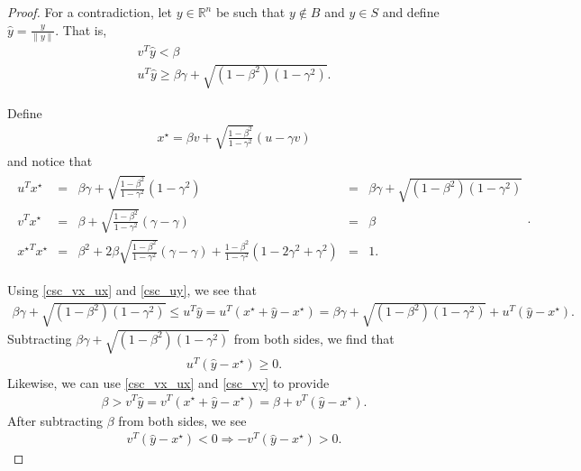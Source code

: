 \documentclass{article}
\theoremstyle{case}
\newcommand{\Rn}{\mathbb R^n}
\begin{document}
\begin{proof}
For a contradiction, let $y \in \Rn$ be such that $y \not \in B$ and $y \in S$ and define $\hat y = \frac{y}{\|y\|}$.
That is,
\begin{align}
v^T\hat y < \beta \label{csc_vy} \\
u^T\hat y \ge \beta\gamma + \sqrt{\left(1 - \beta^2\right)\left(1 - \gamma^2\right)}. \label{csc_uy}
\end{align}

Define
\begin{align*}
x^{\star} = \beta v + \sqrt{\frac{1 - \beta^2}{1 - \gamma^2}} (u - \gamma v )
\end{align*} and notice that
\begin{align}
\begin{array}{ccccc}
{u}^Tx^{\star} &=& \beta\gamma + \sqrt{\frac{1 - \beta^2}{1 - \gamma^2}} (1 - \gamma^2) &=&  \beta\gamma + \sqrt{\left(1 - \beta^2\right)\left(1 - \gamma^2\right)} \\
{v}^Tx^{\star} &=& \beta + \sqrt{\frac{1 - \beta^2}{1 - \gamma^2}}(\gamma - \gamma) &=& \beta \\
{x^{\star}}^Tx^{\star} &=& \beta^2 + 2\beta\sqrt{\frac{1 - \beta^2}{1 - \gamma^2}}(\gamma - \gamma) + \frac{1 - \beta^2}{1 - \gamma^2} (1- 2\gamma^2 + \gamma^2)&=& 1.
\end{array}. \label{csc_vx_ux}
\end{align}

Using \cref{csc_vx_ux} and \cref{csc_uy}, we see that
\begin{align*}
\beta\gamma + \sqrt{\left(1 - \beta^2\right)\left(1 - \gamma^2\right)} \le {u}^T\hat y = {u}^T\left(x^{\star} + \hat y - x^{\star}\right) 
= \beta \gamma + \sqrt{(1 - \beta^2)\left(1 - \gamma^2\right)} + {u}^T\left(\hat y - x^{\star}\right).
\end{align*}
Subtracting $\beta\gamma + \sqrt{\left(1 - \beta^2\right)\left(1 - \gamma^2\right)}$ from both sides, we find that
\begin{align}
{u}^T\left(\hat y - x^{\star}\right) \ge 0 \label{csc_uymx}.
\end{align}
Likewise, we can use \cref{csc_vx_ux} and \cref{csc_vy} to provide
\begin{align*}
\beta > {v}^T\hat y = {v}^T\left(x^{\star} + \hat y - x^{\star}\right) = \beta + {v}^T\left(\hat y - x^{\star}\right).
\end{align*}
After subtracting $\beta$ from both sides, we see
\begin{align}
{v}^T\left(\hat y - x^{\star}\right) < 0 \Longrightarrow -{v}^T\left(\hat y - x^{\star}\right) > 0. \label{csc_vymx}
\end{align}


\end{proof}
\end{document}

